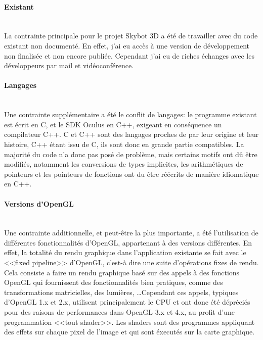\documentclass[a4paper,french,12pt]{article}
\begin{document}
	    \paragraph{Existant} ~\\
	    
		La contrainte principale pour le projet Skybot 3D a été de travailler avec du code existant non documenté.
		En effet, j'ai eu accès à une version de développement non finalisée et non encore publiée. Cependant j'ai 
		eu de riches échanges avec les développeurs par mail et vidéoconférence.
		
	    \paragraph{Langages} ~\\
	      
		Une contrainte supplémentaire a été le conflit de langages: le programme existant est écrit en C, et le
		SDK Oculus en C++, exigeant en conséquence un compilateur C++. 
		C et C++ sont des langages proches de par leur origine et leur histoire, C++ étant issu de C, 
		ils sont donc en grande partie compatibles. La majorité du code n'a donc pas posé de problème, 
		mais certains motifs ont dû être modifiés, notamment les conversions de types implicites,
		les arithmétiques de pointeurs et les pointeurs de fonctions ont du être réécrits de manière
		idiomatique en C++.
		
	    \paragraph{Versions d'OpenGL} ~\\
	    
		Une contrainte additionnelle, et peut-être la plus importante, a été l'utilisation de différentes 
		fonctionnalités d'OpenGL, appartenant à des versions différentes.
		En effet, la totalité du rendu graphique dans l'application existante se fait avec le <<fixed pipeline>> 
		d'OpenGL, c'est-à dire une suite d'opérations fixes de rendu. Cela consiste a faire un rendu graphique basé sur des
		appels à des fonctions OpenGL qui fournissent des fonctionnalités bien pratiques, comme des transformations
		matricielles, des lumières, \ldots Cependant ces appels, typiques d'OpenGL 1.x et 2.x, 
		utilisent principalement le CPU et ont donc
		été dépréciés pour des raisons de performances dans OpenGL 3.x et 4.x, au profit d'une programmation
		<<tout shader>>. Les shaders sont des programmes appliquant des effets sur chaque pixel de l'image et qui
		sont éxecutés sur la carte graphique.
		
\end{document}
